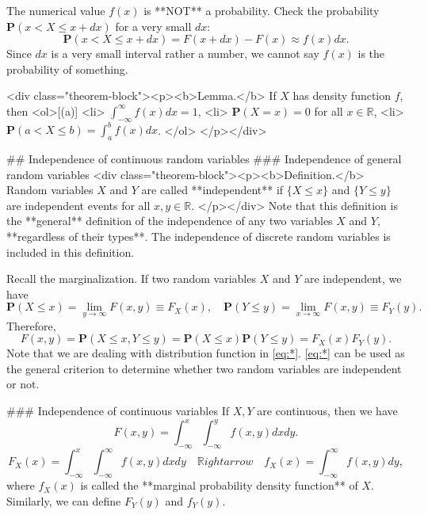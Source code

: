 The numerical value $f(x)$ is **NOT** a probability. Check the probability $\mathbf{P}(x < X \leq x + dx)$ for a very small $dx$:
$$\begin{equation}
    \mathbf{P}(x < X \leq x + dx) = F(x + dx) - F(x) \approx f(x) dx. 
\end{equation}$$
Since $dx$ is a very small interval rather a number, we cannot say $f(x)$ is the probability of something.

<div class="theorem-block"><p><b>Lemma.</b> 
If $X$ has density function $f$, then
<ol>[(a)]
    <li> $\int_{-\infty}^\infty f(x)dx = 1$,
    <li> $\mathbf{P}(X=x) = 0$ for all $x \in \mathbb{R}$,
    <li> $\mathbf{P}(a < X \leq b) = \int_a^b f(x)dx$.
</ol>
</p></div>

## Independence of continuous random variables
### Independence of general random variables
<div class="theorem-block"><p><b>Definition.</b> 
Random variables $X$ and $Y$ are called **independent** if $\{ X \leq x\}$ and $\{Y \leq y\}$ are independent events for all $x, y \in \mathbb{R}$. 
</p></div>
Note that this definition is the **general** definition of the independence of any two variables $X$ and $Y$, **regardless of their types**. The independence of discrete random variables is included in this definition. 

Recall the marginalization. If two random variables $X$ and $Y$ are independent, we have
$$\begin{equation}
    \mathbf{P}(X\leq x) = \lim_{y\to\infty}F(x, y) \equiv F_X(x), \quad 
    \mathbf{P}(Y \leq y) = \lim_{x\to\infty}F(x, y) \equiv F_Y(y).
\end{equation}$$
Therefore,
$$$$\begin{equation}
    \label{eq:*}
    \tag{*}
    F(x,y) = \mathbf{P}(X \leq x, Y \leq y) = \mathbf{P}(X\leq x) \mathbf{P}(Y \leq y) = F_X(x) F_Y(y). 
\end{equation}$$$$
Note that we are dealing with distribution function in \eqref{eq:*}. \eqref{eq:*} can be used as the general criterion to determine whether two random variables are independent or not.

### Independence of continuous variables
If $X, Y$ are continuous, then we have
$$\begin{equation}
    F(x, y) = \int_{-\infty}^x \int_{-\infty}^y f(x,y) dx dy.
\end{equation}$$
$$\begin{equation}
    F_X(x) = \int_{-\infty}^x \int_{-\infty}^\infty f(x, y)dx dy \quad \mathbb{R}ightarrow \quad f_X(x) = \int_{-\infty}^\infty f(x,y)dy,
\end{equation}$$
where $f_X(x)$ is called the **marginal probability density function** of $X$. Similarly, we can define $F_Y(y)$ and $f_Y(y)$.

